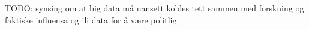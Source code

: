 TODO: synsing om at big data må uansett kobles tett sammen med forskning og faktiske influensa og ili data for å være politlig.












































